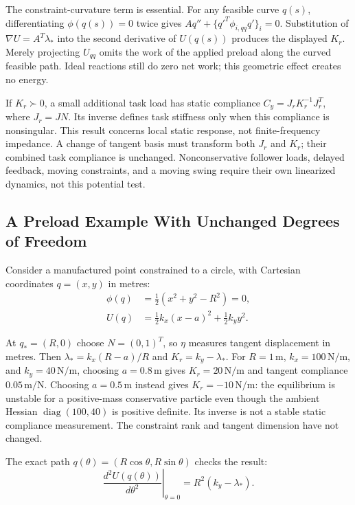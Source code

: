 The constraint-curvature term is essential. For any feasible curve $q(s)$,
differentiating $\phi(q(s))=0$ twice gives
$Aq''+\{q'^T\phi_{i,qq}q'\}_i=0$. Substitution of
$\nabla U=A^T\lambda_*$ into the second derivative of $U(q(s))$ produces
the displayed $K_r$. Merely projecting $U_{qq}$ omits the work of the applied
preload along the curved feasible path. Ideal reactions still do zero net
work; this geometric effect creates no energy.

If $K_r\succ0$, a small additional task load has static compliance
$C_y=J_rK_r^{-1}J_r^T$, where $J_r=JN$. Its inverse defines task stiffness
only when this compliance is nonsingular. This result concerns local static
response, not finite-frequency impedance. A change of tangent basis must
transform both $J_r$ and $K_r$; their combined task compliance is unchanged.
Nonconservative follower loads, delayed feedback, moving constraints, and a
moving swing require their own linearized dynamics, not this potential test.

\subsection{A Preload Example With Unchanged Degrees of Freedom}

Consider a manufactured point constrained to a circle, with Cartesian
coordinates $q=(x,y)$ in metres:
\begin{equation}
\begin{aligned}
\phi(q)&=\tfrac12(x^2+y^2-R^2)=0,\\
U(q)&=\tfrac12k_x(x-a)^2+\tfrac12k_y y^2.
\end{aligned}
\label{eq:loaded-loop-example}
\end{equation}

At $q_*=(R,0)$ choose $N=(0,1)^T$, so $\eta$ measures tangent displacement
in metres. Then $\lambda_*=k_x(R-a)/R$ and $K_r=k_y-\lambda_*$.
For $R=1\,\mathrm{m}$, $k_x=100\,\mathrm{N/m}$, and
$k_y=40\,\mathrm{N/m}$, choosing $a=0.8\,\mathrm{m}$ gives
$K_r=20\,\mathrm{N/m}$ and tangent compliance $0.05\,\mathrm{m/N}$.
Choosing $a=0.5\,\mathrm{m}$ instead gives $K_r=-10\,\mathrm{N/m}$:
the equilibrium is unstable for a positive-mass conservative particle even
though the ambient Hessian $\operatorname{diag}(100,40)$ is positive definite.
Its inverse is not a stable static compliance measurement. The constraint
rank and tangent dimension have not changed.

The exact path $q(\theta)=(R\cos\theta,R\sin\theta)$ checks the result:
\begin{equation}
\left.\frac{d^2U(q(\theta))}{d\theta^2}\right|_{\theta=0}
=R^2(k_y-\lambda_*).
\label{eq:loaded-loop-curve}
\end{equation}

